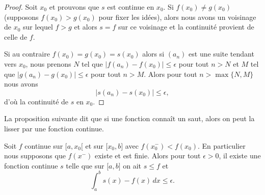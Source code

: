 \begin{proof}
	Soit \( x_0\) et prouvons que \( s\) est continue en \( x_0\). Si \( f(x_0)\neq g(x_0)\) (supposons \( f(x_0)>g(x_0)\) pour fixer les idées), alors nous avons un voisinage de \( x_0\) sur lequel \( f>g\) et alors \( s=f\) sur ce voisinage et la continuité provient de celle de \( f\).

	Si au contraire \( f(x_0)=g(x_0)=s(x_0)\) alors si \( (a_n)\) est une suite tendant vers \( x_0\), nous prenons \( N\) tel que \( \big| f(a_n)-f(x_0) \big|\leq \epsilon\) pour tout \( n>N\) et \( M\) tel que \( \big| g(a_n)-g(x_0) \big|\leq \epsilon\) pour tout \( n> M\). Alors pour tout \( n>\max\{ N,M \}\) nous avons
	\begin{equation}
		\big| s(a_n)-s(x_0) \big|\leq \epsilon,
	\end{equation}
	d'où la continuité de \( s\) en \( x_0\).
\end{proof}

La proposition suivante dit que si une fonction connaît un saut, alors on peut la lisser par une fonction continue.
\begin{proposition} \label{PropTIeYVw}
	Soit \( f\) continue sur \( \mathopen[ a , x_0 [\) et sur \( \mathopen[ x_0 , b \mathclose]\) avec \( f(x_0^-)<f(x_0)\). En particulier nous supposons que \( f(x^-)\) existe et est finie. Alors pour tout \( \epsilon>0\), il existe une fonction continue \( s\) telle que sur \( \mathopen[ a , b \mathclose]\) on ait \( s\leq f\) et
	\begin{equation}
		\int_a^bs(x)-f(x)\,dx\leq \epsilon.
	\end{equation}
\end{proposition}

